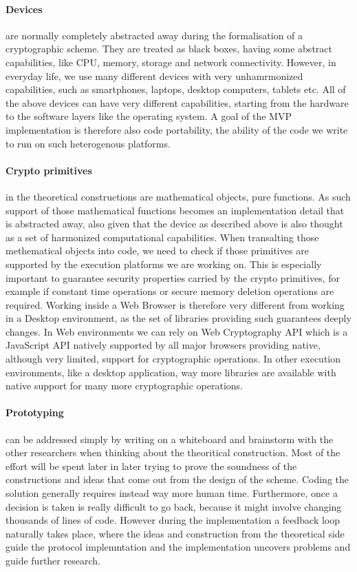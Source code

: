 \paragraph{Devices} are normally completely abstracted away during the formalisation of a cryptographic scheme. 
They are treated as black boxes, having some abstract capabilities, like CPU, memory, storage and network connectivity.
However, in everyday life, we use many different devices with very unhamrmonized capabilities, such as smartphones, laptops, desktop computers, tablets etc.
All of the above devices can have very different capabilities, starting from the hardware to the software layers like the operating system.
A goal of the MVP implementation is therefore also code portability, the ability of the code we write to run on such heterogenous platforms.

\paragraph{Crypto primitives} in the theoretical constructions are mathematical objects, pure functions.
As such support of those mathematical functions becomes an implementation detail that is abstracted away, also given that the device as described above is also thought as a set of harmonized computational capabilities.
When transalting those methematical objects into code, we need to check if those primitives are supported by the execution platforms we are working on. 
This is especially important to guarantee security properties carried by the crypto primitives, for example if constant time operations or secure memory deletion operations are required.
Working inside a Web Browser is therefore very different from working in a Desktop environment, as the set of libraries providing such guarantees deeply changes. 
In Web environments we can rely on Web Cryptography API which is a JavaScript API natively supported by all major browsers providing native, although very limited, support for cryptographic operations.
In other execution environments, like a desktop application, way more libraries are available with native support for many more cryptographic operations.

\paragraph{Prototyping} can be addressed simply by writing on a whiteboard and brainstorm with the other researchers when thinking about the theoritical construction. 
Most of the effort will be spent later in later trying to prove the soundness of the constructions and ideas that come out from the design of the scheme.  
Coding the solution generally requires instead way more human time.
Furthermore, once a decision is taken is really difficult to go back, because it might involve changing thousands of lines of code.
However during the implementation a feedback loop naturally takes place, where the ideas and construction from the theoretical side guide the protocol implemntation and the implementation uncovers problems and guide further research.

